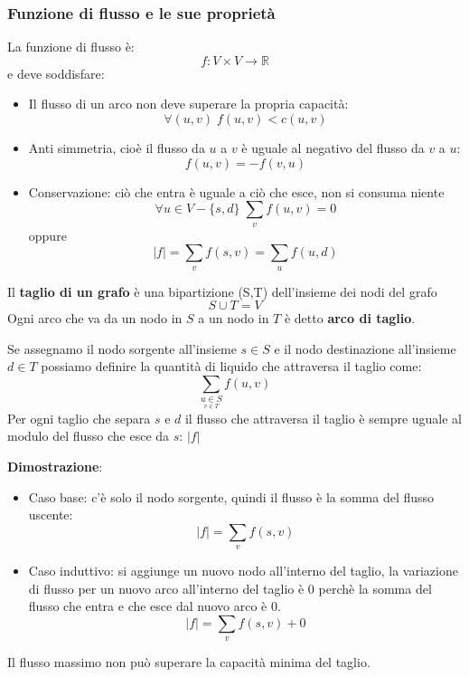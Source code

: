 \documentclass[a4paper]{article}
\begin{document}
\subsubsection{Funzione di flusso e le sue proprietà}
La funzione di flusso è:
\[
  f: V \times V \to \mathbb{R}
\] 
e deve soddisfare:
\begin{itemize}
  \item Il flusso di un arco non deve superare la propria capacità:
    \[
      \forall (u,v) \; f(u,v) < c(u,v)
    \]

  \item Anti simmetria, cioè il flusso da \( u \) a \( v \) è uguale al
    negativo del flusso da \( v \) a \( u \):
    \[
      f(u,v) = -f(v,u)
    \] 

  \item Conservazione: ciò che entra è uguale a ciò che esce, non si consuma niente
    \[
      \forall u \in  V - \{s,d\} \; \sum_v f(u,v) = 0
    \] 
    oppure
    \[
      |f| = \sum_v f(s,v) = \sum_u f(u,d)
    \] 
\end{itemize}
\vspace{1em}
\noindent
\begin{define}
  Il \textbf{taglio di un grafo} è una bipartizione (S,T) dell'insieme dei nodi del grafo 
  \[
    S \cup T = V
  \] 
  Ogni arco che va da un nodo in \( S \) a un nodo in \( T \) è detto \textbf{arco di taglio}.
\end{define}

Se assegnamo il nodo sorgente all'insieme \( s \in S \) e il nodo destinazione
all'insieme \( d \in T \) possiamo definire la quantità di liquido che attraversa il
taglio come:
\[
  \sum_{\underset{v \in T}{u \in S}} f(u,v)
\] 
Per ogni taglio che separa \( s \) e \( d \) il flusso che attraversa il taglio è
sempre uguale al modulo del flusso che esce da \( s \): \( |f| \) 

\textbf{Dimostrazione}: 
\begin{itemize}
  \item Caso base: c'è solo il nodo sorgente, quindi il flusso è la somma del flusso
    uscente:
    \[
      |f| = \sum_{v} f(s,v)
    \]
  \item Caso induttivo: si aggiunge un nuovo nodo all'interno del taglio,
    la variazione di flusso per un nuovo arco all'interno del taglio
    è 0 perchè la somma del flusso che entra e che esce dal nuovo arco è 0.
    \[
      |f| = \sum_{v} f(s,v) + 0
    \]
\end{itemize}
Il flusso massimo non può superare la capacità minima del taglio.
\end{document}
